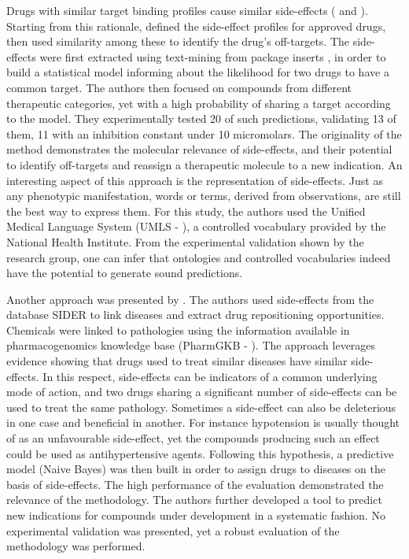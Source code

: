 Drugs with similar target binding profiles cause similar side-effects (\cite{fliri2005analysis} and \cite{fliri2007analysis}). Starting from this rationale, \citep{campillos2008drug} defined the side-effect profiles for approved drugs, then used similarity among these to identify the drug’s off-targets. The side-effects were first extracted using text-mining from package inserts \citep{campillos2008drug}, in order to build a statistical model informing about the likelihood for two drugs to have a common target. The authors then focused on compounds from different therapeutic categories, yet with a high probability of sharing a target according to the model. They experimentally tested 20 of such predictions, validating 13 of them, 11 with an inhibition constant under 10 micromolars. The originality of the method demonstrates the molecular relevance of side-effects, and their potential to identify off-targets and reassign a therapeutic molecule to a new indication. An interesting aspect of this approach is the representation of side-effects. Just as any phenotypic manifestation, words or terms, derived from observations, are still the best way to express them. For this study, the authors used the Unified Medical Language System (UMLS - \cite{bodenreider2004unified}), a controlled vocabulary provided by the National Health Institute. From the experimental validation shown by the research group, one can infer that ontologies and controlled vocabularies indeed have the potential to generate sound predictions.

Another approach was presented by \citep{yang2011systematic}. The authors used side-effects from the database SIDER to link diseases and extract drug repositioning opportunities. Chemicals were linked to pathologies using the information available in pharmacogenomics knowledge base (PharmGKB - \cite{whirl2012pharmacogenomics}). The approach leverages evidence showing that drugs used to treat similar diseases have similar side-effects. In this respect, side-effects can be indicators of a common underlying mode of action, and two drugs sharing a significant number of side-effects can be used to treat the same pathology. Sometimes a side-effect can also be deleterious in one case and beneficial in another. For instance hypotension is usually thought of as an unfavourable side-effect, yet the compounds producing such an effect could be used as antihypertensive agents. Following this hypothesis, a predictive model (Naive Bayes) was then built in order to assign drugs to diseases on the basis of side-effects. The high performance of the evaluation demonstrated the relevance of the methodology. The authors further developed a tool to predict new indications for compounds under development in a systematic fashion. No experimental validation was presented, yet a robust evaluation of the methodology was performed.

